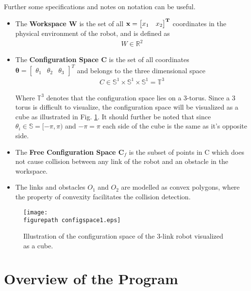 Further some specifications and notes on notation can be useful. 
\begin{itemize} 

 \item The \textbf{Workspace W} is the set of all $\bf x = \begin{bmatrix} x_1 & x_2  \end{bmatrix}^T$ coordinates in the physical environment of the robot, and is defined as
\begin{align}
\label{eq:}
 W \in \mathbb{R}^2
 \end{align}

\item The \textbf{Configuration Space C} is the set of all  coordinates $\boldsymbol{ \theta } =  \begin{bmatrix} \theta_1 & \theta_2 & \theta_3  \end{bmatrix}^T$  and belongs to the three dimensional space 
\begin{align}
\label{eq:}
 C \in \mathbb{S}^1 \times \mathbb{S}^1 \times\mathbb{S}^1 = \mathbb{T}^3 
 \end{align}

Where $ \mathbb{T}^3 $ denotes that the configuration space lies on a 3-torus. Since a 3 torus is difficult to visualize, the configuration space will be visualized as a cube as illustrated in Fig. \ref{fig:cs1}. It should further be noted that since $\theta_i  \in \mathbb{S} = [ -\pi , \pi )$ and $-\pi=\pi$ each side of the cube is the same as it's opposite side.

\item The \textbf{Free Configuration Space $ \mathbf C_f$} is the subset of points in C which  does not cause collision between any link of the robot and an obstacle in the workspace.

\item The links and obstacles $O_1 $ and $O_2$ are modelled as convex polygons, where the property of convexity facilitates the collision detection.

 \end{itemize}

\begin{figure}[h!] 
 \center 
 \texttt{[image: \\figurepath configspace1.eps]}
 \caption{ Illustration of the configuration space of the 3-link robot visualized as a cube. \label{fig:cs1}}
 \end{figure}


\section{Overview of the Program}

